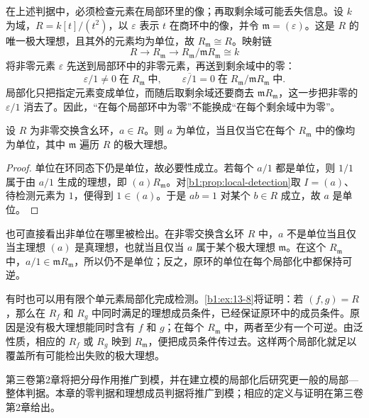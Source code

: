 \ProseParagraphBreak
在上述判据中，必须检查元素在局部环里的像；再取剩余域可能丢失信息。设 \(k\) 为域，\(R=k[t]/(t^2)\)，以 \(\varepsilon\) 表示 \(t\) 在商环中的像，并令 \(\mathfrak m=(\varepsilon)\)。这是 \(R\) 的唯一极大理想，且其外的元素均为单位，故 \(R_{\mathfrak m}\cong R\)。映射链
\[
	R\longrightarrow R_{\mathfrak m} \longrightarrow R_{\mathfrak m}/\mathfrak mR_{\mathfrak m}\cong k
\]
将非零元素 \(\varepsilon\) 先送到局部环中的非零元素，再送到剩余域中的零：
\[
	\varepsilon/1\ne0\;\text{在}\;R_{\mathfrak m}\;\text{中}, \qquad \overline{\varepsilon/1}=0\;\text{在}\;R_{\mathfrak m}/\mathfrak mR_{\mathfrak m}\;\text{中}.
\]
局部化只把指定元素变成单位，而随后取剩余域还要商去 \(\mathfrak mR_{\mathfrak m}\)，这一步把非零的 \(\varepsilon/1\) 消去了。因此，“在每个局部环中为零”不能换成“在每个剩余域中为零”。

\begin{corollary}\label{b1:cor:local-unit-detection}
	设 \(R\) 为非零交换含幺环，\(a\in R\)。则 \(a\) 为单位，当且仅当它在每个 \(R_{\mathfrak m}\) 中的像均为单位，其中 \(\mathfrak m\) 遍历 \(R\) 的极大理想。
\end{corollary}
\begin{proof}
	单位在环同态下仍是单位，故必要性成立。若每个 \(a/1\) 都是单位，则 \(1/1\) 属于由 \(a/1\) 生成的理想，即 \((a)R_{\mathfrak m}\)。对\cref{b1:prop:local-detection}取 \(I=(a)\)、待检测元素为 \(1\)，便得到 \(1\in(a)\)。于是 \(ab=1\) 对某个 \(b\in R\) 成立，故 \(a\) 是单位。
\end{proof}

也可直接看出非单位在哪里被检出。在非零交换含幺环 \(R\) 中，\(a\) 不是单位当且仅当主理想 \((a)\) 是真理想，也就当且仅当 \(a\) 属于某个极大理想 \(\mathfrak m\)。在这个 \(R_{\mathfrak m}\) 中，\(a/1\in\mathfrak mR_{\mathfrak m}\)，所以仍不是单位；反之，原环的单位在每个局部化中都保持可逆。

\ProseParagraphBreak
有时也可以用有限个单元素局部化完成检测。\cref{b1:ex:13-8}将证明：若 \((f,g)=R\)，那么在 \(R_f\) 和 \(R_g\) 中同时满足的理想成员条件，已经保证原环中的成员条件。原因是没有极大理想能同时含有 \(f\) 和 \(g\)；在每个 \(R_{\mathfrak m}\) 中，两者至少有一个可逆。由泛性质，相应的 \(R_f\) 或 \(R_g\) 映到 \(R_{\mathfrak m}\)，便把成员条件传过去。这样两个局部化就足以覆盖所有可能检出失败的极大理想。

\ProseParagraphBreak
第三卷第2章将把分母作用推广到模，并在建立模的局部化后研究更一般的局部—整体判据。本章的零判据和理想成员判据将推广到模；相应的定义与证明在第三卷第2章给出。
